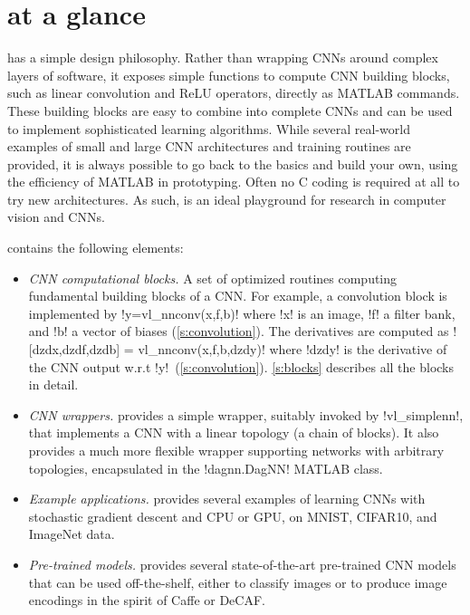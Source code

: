 \section{\matconvnet at a glance}\label{s:vlnn}

\matconvnet has a simple design philosophy. Rather than wrapping CNNs around complex layers of software, it exposes simple functions to compute CNN building blocks, such as linear convolution and ReLU operators, directly as MATLAB commands. These building blocks are easy to combine into complete CNNs and can be used to implement sophisticated learning algorithms. While several real-world examples of small and large CNN architectures and training routines are provided, it is always possible to go back to the basics and build your own, using the efficiency of MATLAB in prototyping. Often no C coding is required at all to try new architectures. As such, \matconvnet is an ideal playground for research in computer vision and CNNs.

\matconvnet contains the following elements:
\begin{itemize}
\item \emph{CNN computational blocks.} A set of optimized routines computing fundamental building blocks of a CNN. For example, a convolution block is implemented by \linebreak !y=vl_nnconv(x,f,b)! where !x! is an image, !f! a filter bank, and !b! a vector of biases (\autoref{s:convolution}). The derivatives are computed as
![dzdx,dzdf,dzdb] = vl_nnconv(x,f,b,dzdy)! where !dzdy! is the derivative of the CNN output w.r.t !y!~(\autoref{s:convolution}). \autoref{s:blocks} describes all the blocks in detail.
\item \emph{CNN wrappers.} \matconvnet provides a simple wrapper, suitably invoked by !vl_simplenn!, that implements a CNN with a linear topology (a chain of blocks). It also provides a much more flexible wrapper supporting networks with arbitrary topologies, encapsulated in the !dagnn.DagNN! MATLAB class.
\item \emph{Example applications.} \matconvnet provides several examples of learning CNNs with stochastic gradient descent and CPU or GPU, on MNIST, CIFAR10, and ImageNet data.
\item \emph{Pre-trained models.} \matconvnet provides several state-of-the-art pre-trained CNN models that can be used off-the-shelf, either to classify images or to produce image encodings in the spirit of Caffe or DeCAF.
\end{itemize}


